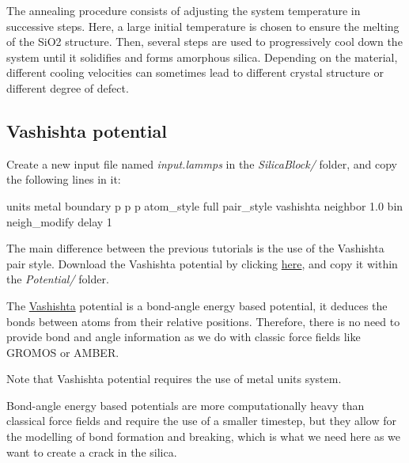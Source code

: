 \begin{tcolorbox}[colback=mylightblue!5!white,colframe=mylightblue!75!black,title=About annealing procedure]
The annealing procedure consists of adjusting the system temperature in successive steps.
Here, a large initial temperature is chosen to ensure the melting of the SiO2 structure.
Then, several steps are used to progressively cool down the system until it solidifies and forms 
amorphous silica. Depending on the material, different cooling velocities can sometimes
lead to different crystal structure or different degree of defect.
\end{tcolorbox}

\noindent \subsection{Vashishta potential}

Create a new input file named \textit{input.lammps} in the \textit{SilicaBlock/} folder, and copy
the following lines in it:

\begin{lcverbatim}
units metal
boundary p p p
atom_style full
pair_style vashishta
neighbor 1.0 bin
neigh_modify delay 1
\end{lcverbatim}

\noindent The main difference between the previous tutorials is the use of 
the Vashishta pair style. Download the Vashishta potential by
clicking \href{../../../../../inputs/level3/water-adsorption-in-silica/Potential/SiO.1990.vashishta}{here}, and copy it within the \textit{Potential/} folder.

\begin{tcolorbox}[colback=mylightblue!5!white,colframe=mylightblue!75!black,title=About the Vashishta potential]
The \href{https://pubmed.ncbi.nlm.nih.gov/9993674/}{Vashishta}
potential is a bond-angle energy based potential, it
deduces the bonds between atoms from their relative
positions. Therefore, there is no need to provide bond
and angle information as we do with classic force fields
like GROMOS or AMBER.

Note that Vashishta potential requires the use of metal units system. 

Bond-angle energy based potentials
are more computationally heavy than classical force
fields and require the use of a smaller timestep, but
they allow for the modelling of bond formation and
breaking, which is what we need here as we want to create
a crack in the silica.
\end{tcolorbox}

